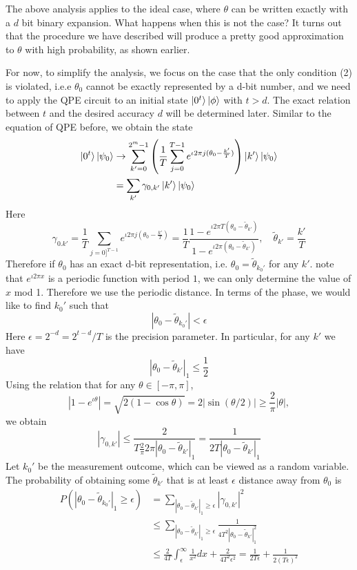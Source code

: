 The above analysis applies to the ideal case, where $\theta$ can be written exactly with a $d$ bit binary expansion. What happens when this is not the case? It turns out that the procedure we have described will produce a pretty good approximation to $\theta$ with high probability, as shown earlier.

For now, to simplify the analysis, we focus on the case that the only condition (2) is violated, i.e.e $\theta_0$ cannot be exactly represented by a d-bit number, and we need to apply the QPE circuit to an initial state $\ket{0^t}\ket{\phi}$ with $t>d$. The exact relation between $t$ and the desired accuracy $d$ will be determined later. Similar to the equation of QPE before, we obtain the state
\begin{align*}
\ket{0^t}\ket{\psi_0} &\rightarrow \sum_{k'=0}^{2^m-1} \left(\frac{1}{T}\sum_{j=0}^{T-1} e^{\iota 2 \pi j(\theta_0-\frac{k'}{T})}\right) \ket{k'}\ket{\psi_0}\\
&=\sum_{k'} \gamma_{0,k'} \ket{k'}\ket{\psi_0}
\end{align*}
Here
\[
\gamma_{0.k'} = \frac{1}{T}\sum_{j=0]^{T-1}} e^{\iota 2 \pi j(\theta_0 - \frac{k'}{T})} = \frac{1}{T}\frac{1-e^{\iota 2 \pi T(\theta_0 -\tilde{\theta}_{k'})}}{1-e^{\iota 2 \pi (\theta_0-\tilde{\theta}_{k'})}}, \quad \tilde{\theta}_{k'}=\frac{k'}{T}
\]
Therefore if $\theta_0$ has an exact d-bit representation, i.e. $\theta_0=\tilde{\theta}_{k_0'}$ for any $k'$. note that $e^{\iota 2 \pi x}$ is a periodic function with period $1$, we can only determine the value of $x$ mod 1. Therefore we use the periodic distance. In terms of the phase, we would like to find $k_0'$ such that
\[
|\theta_0-\tilde{\theta}_{k_0'}|<\epsilon
\]
Here $\epsilon=2^{-d}=2^{t-d}/T$ is the precision parameter. In particular, for any $k'$ we have
\[
|\theta_0-\tilde{\theta}_{k'}|_1 \leq \frac{1}{2}
\]
Using the relation that for any $\theta \in [-\pi,\pi]$,
\[
|1-e^{\iota \theta}| =\sqrt{2(1-\cos \theta)} =2 |\sin (\theta/2)|\geq \frac{2}{\pi}|\theta|,
\]
we obtain
\[
|\gamma_{0,k'}|\leq \frac{2}{T\frac{2}{\pi}2\pi |\theta_0-\tilde{\theta}_{k'}|_1} =\frac{1}{2T|\theta_0-\tilde{\theta}_{k'}|_1}
\]
Let $k_0'$ be the measurement outcome, which can be viewed as a random variable. The probability of obtaining some $\tilde{\theta}_{k'}$ that is at least $\epsilon$ distance away from $\theta_0$ is
\begin{align*}
P(|\theta_0-\tilde{\theta}_{k_0'}|_1 \geq \epsilon)&=\sum_{|\theta_0-\tilde{\theta}_{k'}|_1\geq \epsilon} |\gamma_{0,k'}|^2\\
&\leq \sum_{|\theta_0-\tilde{\theta}_{k'}|_1 \geq \epsilon} \frac{1}{4T^2 |\theta_0-\tilde{\theta}_{k'}|_1^2}\\
&\leq \frac{2}{4T} \int_{\epsilon}^{\infty} \frac{1}{x^2}dx +\frac{2}{4T^2\epsilon^2} = \frac{1}{2T\epsilon} +\frac{1}{2(T\epsilon)^2}
\end{align*}
